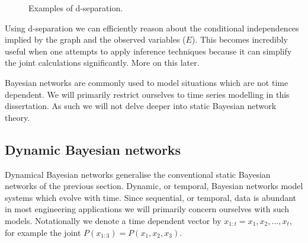 \begin{figure}[H] 
\centering
{}
\caption{Examples of d-separation.}
\label{fig_dsep}
\end{figure}
Using d-separation we can efficiently reason about the conditional independences implied by the graph and the observed variables ($E$). This becomes incredibly useful when one attempts to apply inference techniques because it can simplify the joint calculations significantly. More on this later.

Bayesian networks are commonly used to model situations which are not time dependent. We will primarily restrict ourselves to time series modelling in this dissertation. As such we will not delve deeper into static Bayesian network theory.

\subsection{Dynamic Bayesian networks}
\label{sec_dbns_lit}
Dynamical Bayesian networks generalise the conventional static Bayesian networks of the previous section. Dynamic, or temporal, Bayesian networks model systems which evolve with time. Since sequential, or temporal, data is abundant in most engineering applications we will primarily concern ourselves with such models. Notationally we denote a time dependent vector by $x_{1:t}=x_1,x_2,...,x_t$, for example the joint $P(x_{1:3})=P(x_1,x_2,x_3)$.

